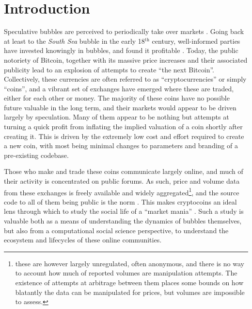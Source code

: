 \section{Introduction}

Speculative bubbles are perceived to periodically take over markets \cite{garber2001famous}.
Going back at least to the \emph{South Sea} bubble in the early 18$^{\text{th}}$ century, well-informed parties  have invested knowingly in bubbles, and found it profitable \cite{temin2004riding}.
Today, the public notoriety of Bitcoin, together with its massive price increases and their associated publicity lead to an explosion of attempts to create ``the next Bitcoin''.
Collectively, these currencies are often referred to as ``cryptocurrencies'' or simply ``coins'', and a vibrant set of exchanges have emerged where these are traded, either for each other or money.
The majority of these coins have no possible future valuable in the long term, and their markets would appear to be driven largely by speculation.
Many of them appear to be nothing but attempts at turning a quick profit from inflating the implied valuation of a coin shortly after creating it.
This is driven by the extremely low cost and effort required to create a new coin, with most being minimal changes to parameters and branding of a pre-existing codebase.

Those who make and trade these coins communicate largely online, and much of their activity is concentrated on public forums. 
As such, price and volume data from these exchanges is freely available and widely aggregated\footnote{ these are however largely unregulated, often anonymous, and there is no way to account how much of reported volumes are manipulation attempts. The existence of attempts at arbitrage between them places some bounds on how blatantly the data can be manipulated for prices, but volumes are impossible to assess. },
and the source code to all of them being public is the norm%
. This makes cryptocoins
an ideal lens through which to study the social life of a ``market mania'' \cite{cosma2008}.
Such a study is valuable both as a means of understanding the dynamics of bubbles themselves, but also from a computational social science perspective, to understand the ecosystem and lifecycles of these online communities.


